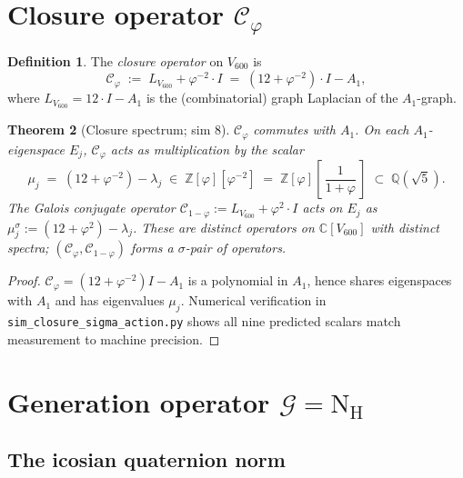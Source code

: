 \documentclass[11pt,a4paper]{article}
\newtheorem{theorem}{Theorem}
\theoremstyle{definition}
\newtheorem{definition}[theorem]{Definition}
\theoremstyle{remark}
\newcommand{\Z}{\mathbb{Z}}
\newcommand{\Q}{\mathbb{Q}}
\newcommand{\C}{\mathbb{C}}
\newcommand{\GG}{\mathcal{G}}
\newcommand{\CC}{\mathcal{C}}
\newcommand{\NH}{\mathrm{N}_{\mathrm{H}}}
\newcommand{\Zphi}{\Z[\varphi]}
\begin{document}
\bigskip

\section{Closure operator $\CC_\varphi$}\label{sec:closure}

\begin{definition}\label{def:closure}
The \emph{closure operator} on $V_{600}$ is
\[
  \CC_\varphi \;:=\; L_{V_{600}} + \varphi^{-2}\!\cdot\! I
  \;=\; (12 + \varphi^{-2})\!\cdot\! I - A_1,
\]
where $L_{V_{600}} = 12\!\cdot\! I - A_1$ is the (combinatorial) graph
Laplacian of the $A_1$-graph.
\end{definition}

\begin{theorem}[Closure spectrum; sim 8]\label{thm:closure-spec}
$\CC_\varphi$ commutes with $A_1$. On each $A_1$-eigenspace $E_j$, $\CC_\varphi$
acts as multiplication by the scalar
\[
  \mu_j \;=\; (12 + \varphi^{-2}) - \lambda_j \;\in\; \Zphi[\varphi^{-2}]
       \;=\; \Zphi[\,\textstyle\frac{1}{1+\varphi}\,]
       \;\subset\; \Q(\sqrt 5).
\]
The Galois conjugate operator $\CC_{1-\varphi} := L_{V_{600}} + \varphi^2\!\cdot\! I$
acts on $E_j$ as $\mu_j^\sigma := (12 + \varphi^2) - \lambda_j$. These are
distinct operators on $\C[V_{600}]$ with distinct spectra; $(\CC_\varphi, \CC_{1-\varphi})$
forms a $\sigma$-pair of operators.
\end{theorem}

\begin{proof}
$\CC_\varphi = (12 + \varphi^{-2}) I - A_1$ is a polynomial in $A_1$, hence
shares eigenspaces with $A_1$ and has eigenvalues $\mu_j$. Numerical
verification in \texttt{sim\_closure\_sigma\_action.py} shows all nine
predicted scalars match measurement to machine precision.
\end{proof}

\bigskip

\section{Generation operator $\GG = \NH$}\label{sec:generation}

\subsection{The icosian quaternion norm}
\end{document}

